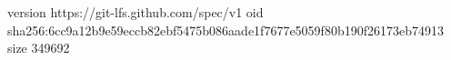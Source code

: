 version https://git-lfs.github.com/spec/v1
oid sha256:6cc9a12b9e59eccb82ebf5475b086aade1f7677e5059f80b190f26173eb74913
size 349692
